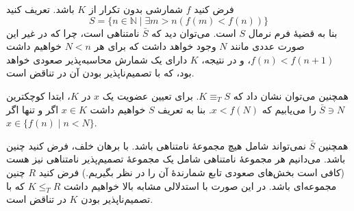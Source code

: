 فرض کنید $f$ شمارشی بدون تکرار از $K$ باشد. تعریف کنید
$$ S = \{ n \in \mathbb{N} \mid \exists m > n (f(m) < f(n)) \} $$
بنا به قضیهٔ فرم نرمال $S$  است. ‌‌‌می‌توان دید که $\bar{S}$ نامتناهی است، چرا که در غیر این صورت عددی مانند $N$ وجود خواهد داشت که برای هر $N < n$ خواهیم داشت $f(n) < f(n + 1)$، و در نتیجه، $K$ دارای یک شمارش محاسبه‌پذیر صعودی خواهد بود، که با تصمیم‌ناپذیر بودن آن در تناقض است.

همچنین می‌توان نشان داد که $K \equiv_T S$. برای تعیین عضویت یک $x$ در $K$، ابتدا کوچکترین $\bar{S} \ni N$ را می‌یابیم که $x < f(N)$. بنا به تعریف $S$ خواهیم داشت $x \in K$ اگر و تنها اگر $x \in \{ f(n) \mid n < N \}$.

همچنین $\bar{S}$ نمی‌تواند شامل هیچ مجموعهٔ  نامتناهی باشد. با برهان خلف، فرض کنید چنین باشد. می‌دانیم هر مجموعهٔ  نامتناهی شامل یک مجموعهٔ تصمیم‌پذیر نامتناهی نیز هست (کافی است بخش‌های صعودی تابع شمارندهٔ آن را در نظر بگیریم.) فرض کنید $R$ چنین مجموعه‌ای باشد. در این صورت با استدلالی مشابه بالا خواهیم داشت $K \le_T R$ که با تصمیم‌ناپذیر بودن $K$ در تناقض است.